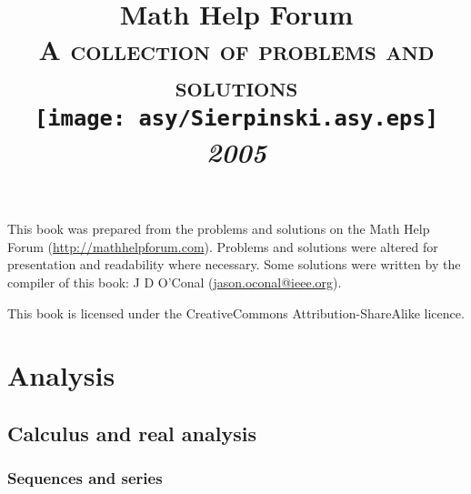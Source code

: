 \documentclass[a4paper]{book}
\makeatletter
\renewcommand\tableofcontents{%
    \if@twocolumn
      \@restonecoltrue\onecolumn
    \else
      \@restonecolfalse
    \fi
    \chapter*{\contentsname}%
        \@mkboth{%
           \MakeUppercase\contentsname}{\MakeUppercase\contentsname}%
    \@starttoc{toc}%
    \if@restonecol\twocolumn\fi
    }
\makeatother
\begin{document}
    \title{Math Help Forum\\\vspace{12pt}\Large\textsc{A collection of problems and solutions}\\\vspace{24pt}\texttt{[image: asy/Sierpinski.asy.eps]}\\\vspace{24pt}\Huge\textit{2005}}
	\author{}
    \date{}

    \maketitle

	This book was prepared from the problems and solutions on the Math Help Forum (\url{http://mathhelpforum.com}). Problems and solutions were altered for presentation and readability where necessary. Some solutions were written by the compiler of this book: J D O'Conal (\url{jason.oconal@ieee.org}).

	This book is licensed under the CreativeCommons Attribution-ShareAlike licence.

	\begin{center}\Huge\bysa\normalsize\end{center}

    \tableofcontents




	\part{Analysis}

    \chapter{Calculus and real analysis}

    \section{Sequences and series}
\end{document}
